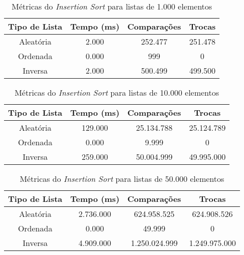 \documentclass[a4paper,12pt]{article}
\begin{document}
\begin{table}[H] 
    \centering 
    \caption{Métricas do \textit{Insertion Sort} para listas de 1.000 elementos} 
    \begin{tabular}{|c|c|c|c|} 
        \hline 
        \textbf{Tipo de Lista} & \textbf{Tempo (ms)} & \textbf{Comparações} & \textbf{Trocas} \\ 
        \hline 
        Aleatória & 2.000 & 252.477 & 251.478 \\ 
        \hline 
        Ordenada & 0.000 & 999 & 0 \\ 
        \hline 
        Inversa & 2.000 & 500.499 & 499.500 \\ 
        \hline 
    \end{tabular} 
\end{table}

\begin{table}[H] 
    \centering 
    \caption{Métricas do \textit{Insertion Sort} para listas de 10.000 elementos} 
    \begin{tabular}{|c|c|c|c|} 
        \hline 
        \textbf{Tipo de Lista} & \textbf{Tempo (ms)} & \textbf{Comparações} & \textbf{Trocas} \\ 
        \hline 
        Aleatória & 129.000 & 25.134.788 & 25.124.789 \\ 
        \hline 
        Ordenada & 0.000 & 9.999 & 0 \\ 
        \hline 
        Inversa & 259.000 & 50.004.999 & 49.995.000 \\ 
        \hline 
    \end{tabular} 
\end{table}

\begin{table}[H] 
    \centering 
    \caption{Métricas do \textit{Insertion Sort} para listas de 50.000 elementos} 
    \begin{tabular}{|c|c|c|c|} 
        \hline 
        \textbf{Tipo de Lista} & \textbf{Tempo (ms)} & \textbf{Comparações} & \textbf{Trocas} \\ 
        \hline 
        Aleatória & 2.736.000 & 624.958.525 & 624.908.526 \\ 
        \hline 
        Ordenada & 0.000 & 49.999 & 0 \\ 
        \hline 
        Inversa & 4.909.000 & 1.250.024.999 & 1.249.975.000 \\ 
        \hline 
    \end{tabular} 
\end{table}
\end{document}
